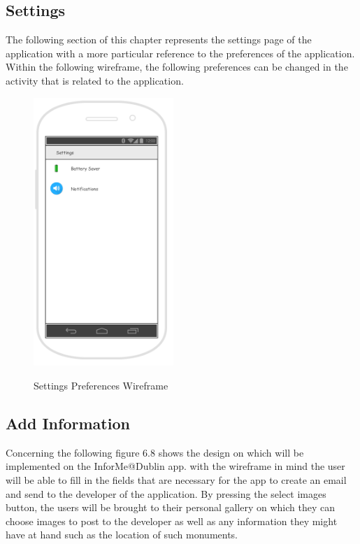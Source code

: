 \newpage
 
\subsection{Settings}
The following section of this chapter represents the settings page of the application with a more particular reference to the preferences of the application. Within the following wireframe, the following preferences can be changed in the activity that is related to the application.

\begin{figure}[htbp]
    \center \includegraphics[width=150pt]{SettingsPreference}\\
    \caption{Settings Preferences Wireframe} \label{Figure: Settings Preferences Wireframe}
\end{figure}

\subsection{Add Information}
Concerning the following figure 6.8 shows the design on which will be implemented on the InforMe@Dublin app. with the wireframe in mind the user will be able to fill in the fields that are necessary for the app to create an email and send to the developer of the application. By pressing the select images button, the users will be brought to their personal gallery on which they can choose images to post to the developer as well as any information they might have at hand such as the location of such monuments.

